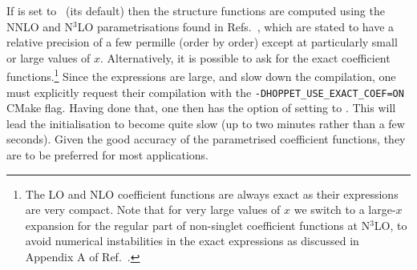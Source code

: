 
If  is set to \ (its default) then the
structure functions are computed using the NNLO and N$^3$LO
parametrisations found in
Refs.~\cite{vanNeerven:1999ca,vanNeerven:2000uj,Moch:2004xu,Vermaseren:2005qc,Moch:2008fj,Davies:2016ruz},
which are stated to have a relative precision of a few permille (order
by order) except at particularly small or large values of $x$.
%
Alternatively, it is possible to ask for the exact coefficient
functions.\footnote{The LO and NLO
coefficient functions are always exact as their expressions are very
compact. Note that for very large values of $x$ we switch to a
large-$x$ expansion for the regular part of non-singlet coefficient
functions at N$^3$LO, to avoid numerical instabilities in the exact
expressions as discussed in Appendix A of
Ref.~\cite{Bertone:2024dpm}.}
%
Since the expressions are large, and slow down the compilation, one
must explicitly request their compilation with the
\texttt{-DHOPPET\_USE\_EXACT\_COEF=ON} CMake flag.
%
Having done that, one then has the option of setting
 to .
%
This will lead the initialisation to become quite slow (up to two
minutes rather than a few seconds).
%
Given the good accuracy of the parametrised coefficient functions,
they are to be preferred for most applications.
% 

